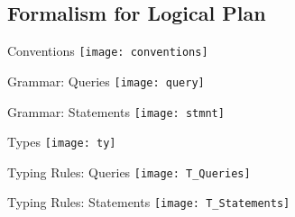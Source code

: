 \subsection{Formalism for Logical Plan}

\begin{frame}{Conventions}
\centering
\texttt{[image: conventions]}
\end{frame}

\begin{frame}{Grammar: Queries}
\centering
\texttt{[image: query]}
\end{frame}

\begin{frame}{Grammar: Statements}
\centering
\texttt{[image: stmnt]}
\end{frame}

\begin{frame}{Types}
\centering
\texttt{[image: ty]}
\end{frame}

\begin{frame}{Typing Rules: Queries}
\centering
\texttt{[image: T\_Queries]}
\end{frame}

\begin{frame}{Typing Rules: Statements}
\centering
\texttt{[image: T\_Statements]}
\end{frame}
